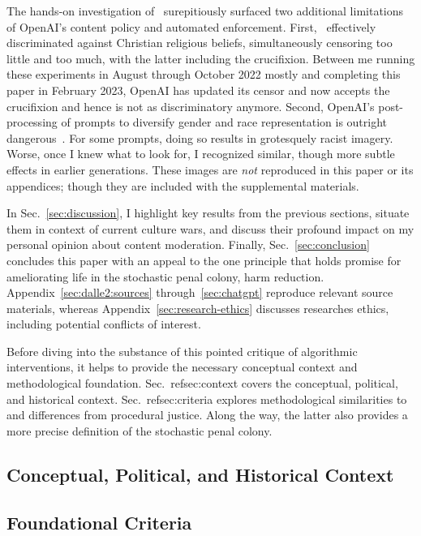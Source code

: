 The hands-on investigation of \DALLE\ surepitiously surfaced two additional
limitations of OpenAI's content policy and automated enforcement. First, \DALLE\
effectively discriminated against Christian religious beliefs, simultaneously
censoring too little and too much, with the latter including the crucifixion.
Between me running these experiments in August through October 2022 mostly and
completing this paper in February 2023, OpenAI has updated its censor and now
accepts the crucifixion and hence is not as discriminatory anymore. Second,
OpenAI's post-processing of prompts to diversify gender and race representation
is outright dangerous~\cite{OpenAI2022e,Sparkes2022}. For some prompts, doing so
results in grotesquely racist imagery. Worse, once I knew what to look for, I
recognized similar, though more subtle effects in earlier generations. These
images are \emph{not} reproduced in this paper or its appendices; though they
are included with the supplemental materials.

In Sec.\ \ref{sec:discussion}, I highlight key results from the previous
sections, situate them in context of current culture wars, and discuss their
profound impact on my personal opinion about content moderation. Finally, Sec.\
\ref{sec:conclusion} concludes this paper with an appeal to the one principle
that holds promise for ameliorating life in the stochastic penal colony, harm
reduction. Appendix~\ref{sec:dalle2:sources} through~\ref{sec:chatgpt} reproduce
relevant source materials, whereas Appendix~\ref{sec:research-ethics} discusses
researches ethics, including potential conflicts of interest.

Before diving into the substance of this pointed critique of algorithmic
interventions, it helps to provide the necessary conceptual context and
methodological foundation. Sec.\ ref{sec:context} covers the conceptual,
political, and historical context. Sec.\ ref{sec:criteria} explores
methodological similarities to and differences from procedural justice. Along
the way, the latter also provides a more precise definition of the stochastic
penal colony.


\subsection{Conceptual, Political, and Historical Context}
\label{sec:context}




\subsection{Foundational Criteria}
\label{sec:criteria}

